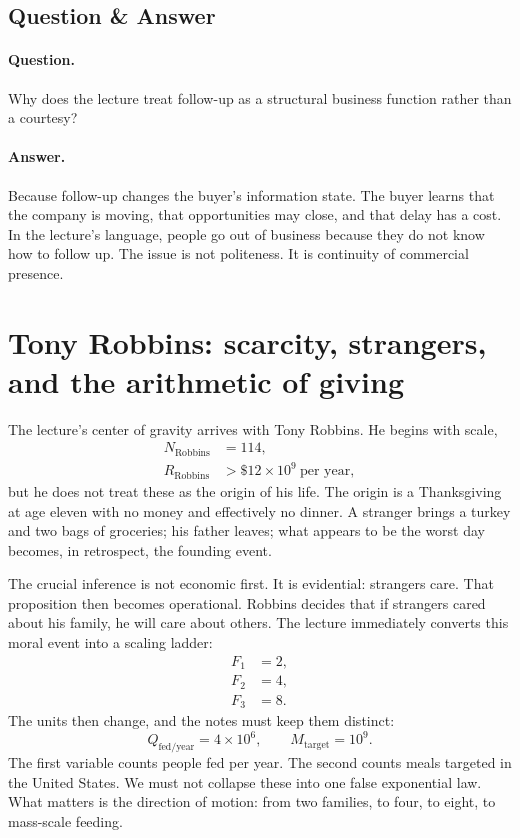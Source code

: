 \subsection{Question \& Answer}

\paragraph{Question.} Why does the lecture treat follow-up as a structural business function rather than a courtesy?

\paragraph{Answer.} Because follow-up changes the buyer's information state. The buyer learns that the company is moving, that opportunities may close, and that delay has a cost. In the lecture's language, people go out of business because they do not know how to follow up. The issue is not politeness. It is continuity of commercial presence.

\section{Tony Robbins: scarcity, strangers, and the arithmetic of giving}

The lecture's center of gravity arrives with Tony Robbins. He begins with scale,
\begin{align}
N_{\text{Robbins}} &= 114,\\
R_{\text{Robbins}} &> \$12\times 10^{9}\ \text{per year},
\end{align}
but he does not treat these as the origin of his life. The origin is a Thanksgiving at age eleven with no money and effectively no dinner. A stranger brings a turkey and two bags of groceries; his father leaves; what appears to be the worst day becomes, in retrospect, the founding event.

The crucial inference is not economic first. It is evidential: strangers care. That proposition then becomes operational. Robbins decides that if strangers cared about his family, he will care about others. The lecture immediately converts this moral event into a scaling ladder:
\begin{align}
F_1 &= 2,\\
F_2 &= 4,\\
F_3 &= 8.
\end{align}
The units then change, and the notes must keep them distinct:
\begin{equation}
Q_{\text{fed/year}} = 4\times 10^{6}, \qquad
M_{\text{target}} = 10^{9}.
\end{equation}
The first variable counts people fed per year. The second counts meals targeted in the United States. We must not collapse these into one false exponential law. What matters is the direction of motion: from two families, to four, to eight, to mass-scale feeding.

